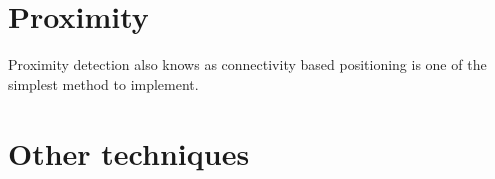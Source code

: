 \section{Proximity}\label{sec:Proximity}
Proximity detection also knows as connectivity based positioning is one of the simplest method to implement.

\section{Other techniques}



